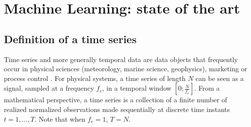\chapter{Machine Learning: state of the art}
\label{chap:premierchapitre}
\minitoc




\section{Definition of a time series}
Time series and more generally temporal data are data objects that frequently occur in physical sciences (meteorology, marine science, geophysics), marketing or process control \cite{Chatfield2004}. For physical systems, a time series of length $N$ can be seen as a signal, sampled at a frequency $f_e$, in a temporal window $[0;\frac{N}{f_e}]$. From a mathematical perspective, a time series is a collection of a finite number of realized normalized observations made sequentially at discrete time instants $t=1,...,T$. Note that when $f_e=1$, $T=N$.

